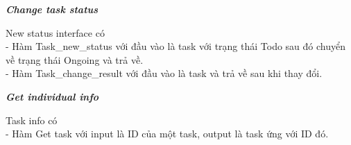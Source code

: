 \documentclass[a4paper]{article}
\begin{document}
\begin{itemize}
\textbf{    \textit{Change task status} } \\
\begin{minipage}[b]{0.4\textwidth}
New status interface có \\
- Hàm Task\_new\_status với đầu vào là task với trạng thái Todo sau đó chuyển về trạng thái Ongoing và trả về.\\
- Hàm Task\_change\_result với đầu vào là task và trả về sau khi thay đổi.
\end{minipage}
\hfill
{}
\newline
\newline

\textbf{\textit{Get individual info} } \\
\begin{minipage}[b]{0.4\textwidth}
Task info có \\
- Hàm Get task với input là ID của một task, output là task ứng với ID đó.
\end{minipage}
\hfill
{}
\newline
\newline
\end{itemize} 
\newpage
\end{document}
